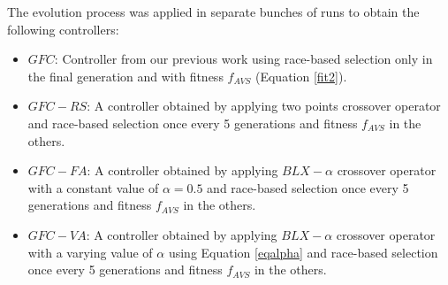 \documentclass[conference]{IEEEtran}
\begin{document}
The evolution process was applied in separate bunches of runs to obtain the following controllers:
\begin{itemize}
	\item $GFC$: Controller  from our previous work \cite{salem_cig2018} 
using race-based selection only in the final generation and with fitness  $f_{AVS}$ (Equation \ref{fit2}).
	\item $GFC-RS$: A controller obtained by applying two points crossover operator and race-based selection once every 5 generations and fitness $f_{AVS}$ in the others. 
	\item $GFC-FA$: A controller obtained by applying $BLX-\alpha$ crossover operator with a constant value of $\alpha=0.5$ and race-based selection once every 5 generations and fitness $f_{AVS}$ in the others. 
	\item $GFC-VA$: A controller obtained by applying $BLX-\alpha$ crossover operator with a varying value of $\alpha$ using Equation \ref{eqalpha} and race-based selection once every 5 generations and fitness $f_{AVS}$ in the others. 
\end{itemize}
\end{document}
